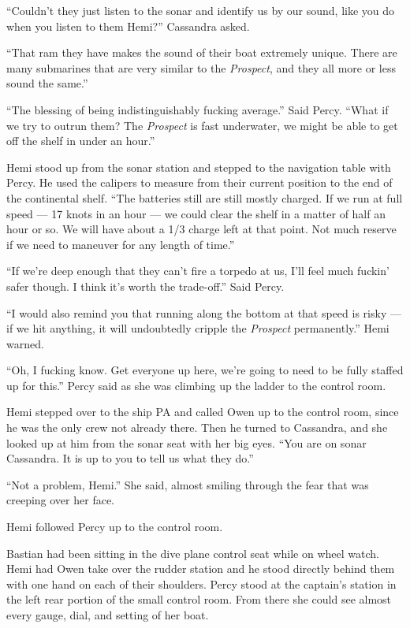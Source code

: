 \documentclass[]{scrbook}
\begin{document}
``Couldn't they just listen to the sonar and identify us by our sound,
like you do when you listen to them Hemi?'' Cassandra asked.

``That ram they have makes the sound of their boat extremely unique.
There are many submarines that are very similar to the \emph{Prospect},
and they all more or less sound the same.''

``The blessing of being indistinguishably fucking average.'' Said Percy.
``What if we try to outrun them? The \emph{Prospect} is fast underwater,
we might be able to get off the shelf in under an hour.''

Hemi stood up from the sonar station and stepped to the navigation table
with Percy. He used the calipers to measure from their current position
to the end of the continental shelf. ``The batteries still are still
mostly charged. If we run at full speed --- 17 knots in an hour --- we
could clear the shelf in a matter of half an hour or so. We will have
about a 1/3 charge left at that point. Not much reserve if we need to
maneuver for any length of time.''

``If we're deep enough that they can't fire a torpedo at us, I'll feel
much fuckin' safer though. I think it's worth the trade-off.'' Said
Percy.

``I would also remind you that running along the bottom at that speed is
risky --- if we hit anything, it will undoubtedly cripple the
\emph{Prospect} permanently.'' Hemi warned.

``Oh, I fucking know. Get everyone up here, we're going to need to be
fully staffed up for this.'' Percy said as she was climbing up the
ladder to the control room.

Hemi stepped over to the ship PA and called Owen up to the control room,
since he was the only crew not already there. Then he turned to
Cassandra, and she looked up at him from the sonar seat with her big
eyes. ``You are on sonar Cassandra. It is up to you to tell us what they
do.''

``Not a problem, Hemi.'' She said, almost smiling through the fear that
was creeping over her face.

Hemi followed Percy up to the control room.

Bastian had been sitting in the dive plane control seat while on wheel
watch. Hemi had Owen take over the rudder station and he stood directly
behind them with one hand on each of their shoulders. Percy stood at the
captain's station in the left rear portion of the small control room.
From there she could see almost every gauge, dial, and setting of her
boat.
\end{document}
